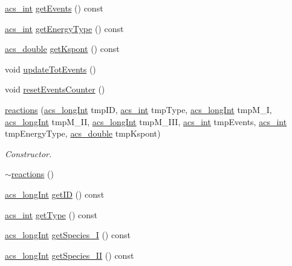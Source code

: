 \begin{DoxyCompactItemize}
\hyperlink{a00050_a8d277355641a098190360234e2ebde35}{acs\+\_\+int} \hyperlink{a00020_a4fd82a3f1a6474e53709c2a8c04b793c}{get\+Events} () const 
\item 
\hyperlink{a00050_a8d277355641a098190360234e2ebde35}{acs\+\_\+int} \hyperlink{a00020_ae6fce196577644283fdab4a78909d891}{get\+Energy\+Type} () const 
\item 
\hyperlink{a00050_ab776853a005fcbf56af0424a2a4dd607}{acs\+\_\+double} \hyperlink{a00020_a3cac13cba00c709df26485bbeffda4f0}{get\+Kspont} () const 
\item 
void \hyperlink{a00020_ae7a0bcb1c921c25ad5dc637d664f2c94}{update\+Tot\+Events} ()
\item 
void \hyperlink{a00020_a614a367a15dda1df4160bcdc170a9b32}{reset\+Events\+Counter} ()
\item 
\hyperlink{a00020_a0b6ca1c86d79bb511f116d86714f74a6}{reactions} (\hyperlink{a00050_a19319d75f02db4308bc5c0026d98cd85}{acs\+\_\+long\+Int} tmp\+I\+D, \hyperlink{a00050_a8d277355641a098190360234e2ebde35}{acs\+\_\+int} tmp\+Type, \hyperlink{a00050_a19319d75f02db4308bc5c0026d98cd85}{acs\+\_\+long\+Int} tmp\+M\+\_\+\+I, \hyperlink{a00050_a19319d75f02db4308bc5c0026d98cd85}{acs\+\_\+long\+Int} tmp\+M\+\_\+\+I\+I, \hyperlink{a00050_a19319d75f02db4308bc5c0026d98cd85}{acs\+\_\+long\+Int} tmp\+M\+\_\+\+I\+I\+I, \hyperlink{a00050_a8d277355641a098190360234e2ebde35}{acs\+\_\+int} tmp\+Events, \hyperlink{a00050_a8d277355641a098190360234e2ebde35}{acs\+\_\+int} tmp\+Energy\+Type, \hyperlink{a00050_ab776853a005fcbf56af0424a2a4dd607}{acs\+\_\+double} tmp\+Kspont)
\begin{DoxyCompactList}\small\item\em Constructor. \end{DoxyCompactList}\item 
\hyperlink{a00020_ad0c79e56e87891c502d8fcd6c4005987}{$\sim$reactions} ()
\item 
\hyperlink{a00050_a19319d75f02db4308bc5c0026d98cd85}{acs\+\_\+long\+Int} \hyperlink{a00020_a5c30ce559254e67f7d4e219a8fe26fcc}{get\+I\+D} () const 
\item 
\hyperlink{a00050_a8d277355641a098190360234e2ebde35}{acs\+\_\+int} \hyperlink{a00020_ad928f8c901ad8e318e201cedcf1209ba}{get\+Type} () const 
\item 
\hyperlink{a00050_a19319d75f02db4308bc5c0026d98cd85}{acs\+\_\+long\+Int} \hyperlink{a00020_a90adbdb8288b8c67c7715949848583ab}{get\+Species\+\_\+\+I} () const 
\item 
\hyperlink{a00050_a19319d75f02db4308bc5c0026d98cd85}{acs\+\_\+long\+Int} \hyperlink{a00020_ac0bdd6d9081645bf3a2c5531a71cbe40}{get\+Species\+\_\+\+I\+I} () const 

\end{DoxyCompactItemize}
